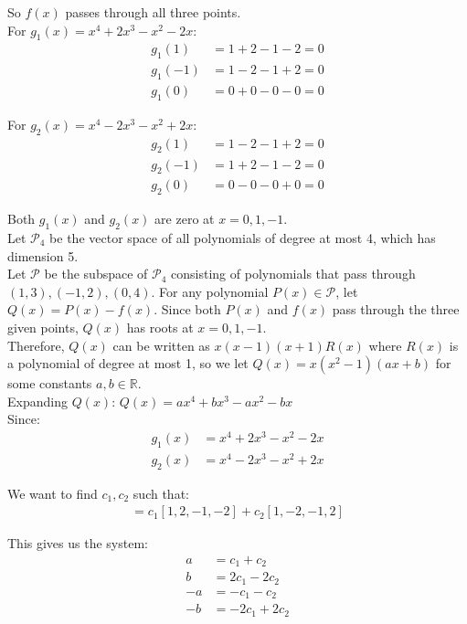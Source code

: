 \documentclass{article}
\begin{document}
So $f(x)$ passes through all three points. \\

For $g_1(x) = x^4 + 2x^3 - x^2 - 2x$:
\begin{align*}
g_1(1) &= 1 + 2 - 1 - 2 = 0 \\
g_1(-1) &= 1 - 2 - 1 + 2 = 0 \\
g_1(0) &= 0 + 0 - 0 - 0 = 0
\end{align*}

For $g_2(x) = x^4 - 2x^3 - x^2 + 2x$:
\begin{align*}
g_2(1) &= 1 - 2 - 1 + 2 = 0 \\
g_2(-1) &= 1 + 2 - 1 - 2 = 0 \\
g_2(0) &= 0 - 0 - 0 + 0 = 0
\end{align*}

Both $g_1(x)$ and $g_2(x)$ are zero at $x = 0, 1, -1$. \\

Let $\mathcal{P}_4$ be the vector space of all polynomials of degree at most 4, which has dimension 5. \\

Let $\mathcal{P}$ be the subspace of $\mathcal{P}_4$ consisting of polynomials that pass through $(1,3), (-1,2), (0,4)$. For any polynomial $P(x) \in \mathcal{P}$, let $Q(x) = P(x) - f(x)$. Since both $P(x)$ and $f(x)$ pass through the three given points, $Q(x)$ has roots at $x = 0, 1, -1$. \\

Therefore, $Q(x)$ can be written as $x(x-1)(x+1)R(x)$ where $R(x)$ is a polynomial of degree at most 1, so we let $Q(x) = x(x^2-1)(ax+b)$ for some constants $a,b \in \mathbb{R}$. \\

Expanding $Q(x)$: $Q(x) = ax^4 + bx^3 - ax^2 - bx$ \\

Since:
\begin{align*}
g_1(x) &= x^4 + 2x^3 - x^2 - 2x \\
g_2(x) &= x^4 - 2x^3 - x^2 + 2x
\end{align*}

We want to find $c_1, c_2$ such that:
\begin{align*}
[a, b, -a, -b] = c_1[1, 2, -1, -2] + c_2[1, -2, -1, 2]
\end{align*}

This gives us the system:
\begin{align*}
a &= c_1 + c_2 \\
b &= 2c_1 - 2c_2 \\
-a &= -c_1 - c_2 \\
-b &= -2c_1 + 2c_2
\end{align*}
\end{document}
